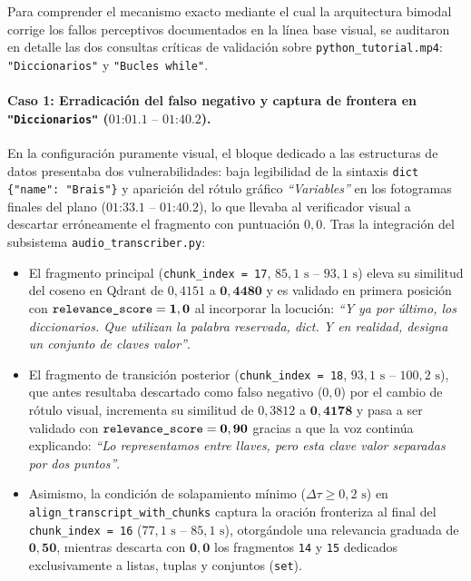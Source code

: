 Para comprender el mecanismo exacto mediante el cual la arquitectura bimodal corrige los fallos perceptivos documentados en la línea base visual, se auditaron en detalle las dos consultas críticas de validación sobre \texttt{python\_tutorial.mp4}: \texttt{"Diccionarios"} y \texttt{"Bucles while"}. %

\paragraph{Caso 1: Erradicación del falso negativo y captura de frontera en \texttt{"Diccionarios"} ($01\text{:}01.1\text{ -- }01\text{:}40.2$).}
En la configuración puramente visual, el bloque dedicado a las estructuras de datos presentaba dos vulnerabilidades: baja legibilidad de la sintaxis \texttt{dict \{"name": "Brais"\}} y aparición del rótulo gráfico \textit{``Variables''} en los fotogramas finales del plano ($01\text{:}33.1\text{ -- }01\text{:}40.2$), lo que llevaba al verificador visual a descartar erróneamente el fragmento con puntuación $0,0$. %
Tras la integración del subsistema \texttt{audio\_transcriber.py}: %
\begin{itemize}
    \item El fragmento principal (\texttt{chunk\_index = 17}, $85,1\text{ s -- }93,1\text{ s}$) eleva su similitud del coseno en Qdrant de $0,4151$ a $\mathbf{0,4480}$ y es validado en primera posición con $\text{\texttt{relevance\_score}} = \mathbf{1,0}$ al incorporar la locución: \textit{``Y ya por último, los diccionarios. Que utilizan la palabra reservada, dict. Y en realidad, designa un conjunto de claves valor''}. %
    \item El fragmento de transición posterior (\texttt{chunk\_index = 18}, $93,1\text{ s -- }100,2\text{ s}$), que antes resultaba descartado como falso negativo ($0,0$) por el cambio de rótulo visual, incrementa su similitud de $0,3812$ a $\mathbf{0,4178}$ y pasa a ser validado con $\text{\texttt{relevance\_score}} = \mathbf{0,90}$ gracias a que la voz continúa explicando: \textit{``Lo representamos entre llaves, pero esta clave valor separadas por dos puntos''}. %
    \item Asimismo, la condición de solapamiento mínimo ($\Delta \tau \ge 0,2\text{ s}$) en \texttt{align\_transcript\_with\_chunks} captura la oración fronteriza al final del \texttt{chunk\_index = 16} ($77,1\text{ s -- }85,1\text{ s}$), otorgándole una relevancia graduada de $\mathbf{0,50}$, mientras descarta con $\mathbf{0,0}$ los fragmentos \texttt{14} y \texttt{15} dedicados exclusivamente a listas, tuplas y conjuntos (\texttt{set}). %
\end{itemize}

